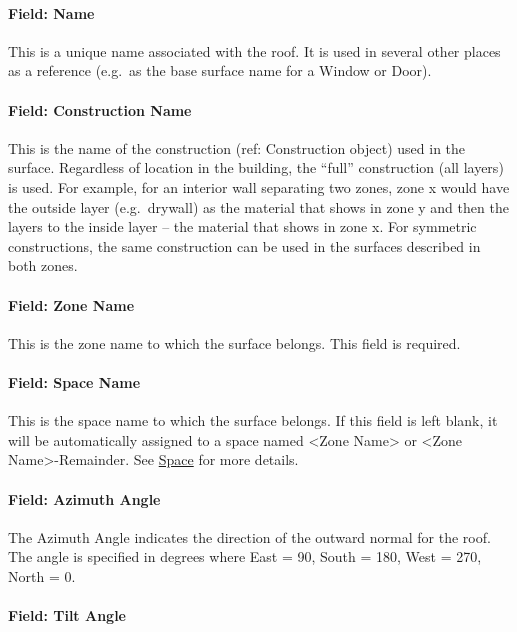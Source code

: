 \paragraph{Field: Name}\label{field-name-4-030}

This is a unique name associated with the roof. It is used in several other places as a reference (e.g.~as the base surface name for a Window or Door).

\paragraph{Field: Construction Name}\label{field-construction-name-4}

This is the name of the construction (ref: Construction object) used in the surface. Regardless of location in the building, the ``full'' construction (all layers) is used. For example, for an interior wall separating two zones, zone x would have the outside layer (e.g.~drywall) as the material that shows in zone y and then the layers to the inside layer -- the material that shows in zone x. For symmetric constructions, the same construction can be used in the surfaces described in both zones.

\paragraph{Field: Zone Name}\label{field-zone-name-4-006}

This is the zone name to which the surface belongs. This field is required.

\paragraph{Field: Space Name}\label{field-space-name-4-006}

This is the space name to which the surface belongs. If this field is left blank, it will be automatically assigned to a space named <Zone Name> or <Zone Name>-Remainder. See \hyperref[space]{Space} for more details.
\paragraph{Field: Azimuth Angle}\label{field-azimuth-angle-4}

The Azimuth Angle indicates the direction of the outward normal for the roof. The angle is specified in degrees where East = 90, South = 180, West = 270, North = 0.

\paragraph{Field: Tilt Angle}\label{field-tilt-angle-4}

